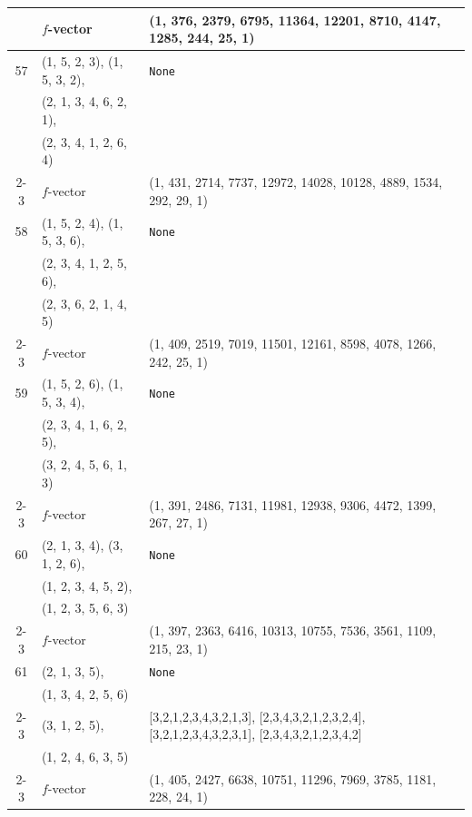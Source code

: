 \documentclass[10pt]{amsart}
\numberwithin{equation}{section}
\theoremstyle{plain}
\theoremstyle{definition}
\theoremstyle{remark}
\begin{document}
{\begin{longtable}{c|l|l}
		& $f$-vector & {(1, 376, 2379, 6795, 11364, 12201, 8710, 4147, 1285, 244, 25, 1)} \\
		\midrule
		
		57 & (1, 5, 2, 3), (1, 5, 3, 2), & \texttt{None} \\
		& (2, 1, 3, 4, 6, 2, 1), &  \\
		& (2, 3, 4, 1, 2, 6, 4) &  \\ \cline{2-3}
		
		& $f$-vector & {(1, 431, 2714, 7737, 12972, 14028, 10128, 4889, 1534, 292, 29, 1)} \\
		\midrule
		
		58 & (1, 5, 2, 4), (1, 5, 3, 6), & \texttt{None} \\
		& (2, 3, 4, 1, 2, 5, 6), &  \\
		& (2, 3, 6, 2, 1, 4, 5) &  \\ \cline{2-3}
		
		& $f$-vector & {(1, 409, 2519, 7019, 11501, 12161, 8598, 4078, 1266, 242, 25, 1)} \\
		\midrule
		
		59 & (1, 5, 2, 6), (1, 5, 3, 4), & \texttt{None} \\
		& (2, 3, 4, 1, 6, 2, 5), &  \\
		& (3, 2, 4, 5, 6, 1, 3) &  \\ \cline{2-3}
		
		& $f$-vector & {(1, 391, 2486, 7131, 11981, 12938, 9306, 4472, 1399, 267, 27, 1)} \\
		\midrule
		
		60 & (2, 1, 3, 4), (3, 1, 2, 6), & \texttt{None} \\
		& (1, 2, 3, 4, 5, 2), &  \\
		& (1, 2, 3, 5, 6, 3) &  \\ \cline{2-3}
		
		& $f$-vector & {(1, 397, 2363, 6416, 10313, 10755, 7536, 3561, 1109, 215, 23, 1)} \\
		\midrule
		
		61 & (2, 1, 3, 5), & \texttt{None} \\
		& (1, 3, 4, 2, 5, 6) &  \\ \cline{2-3}
		
		& (3, 1, 2, 5), & [3,2,1,2,3,4,3,2,1,3], [2,3,4,3,2,1,2,3,2,4], [3,2,1,2,3,4,3,2,3,1], [2,3,4,3,2,1,2,3,4,2] \\
		& (1, 2, 4, 6, 3, 5) &  \\ \cline{2-3}
		
		& $f$-vector & {(1, 405, 2427, 6638, 10751, 11296, 7969, 3785, 1181, 228, 24, 1)} \\
		\midrule
		

\end{longtable}}
\end{document}
